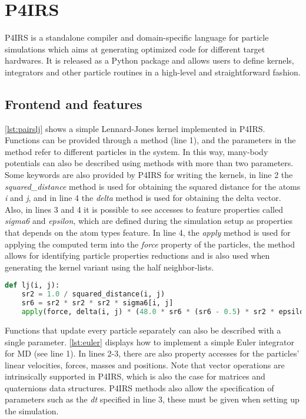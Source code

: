 \documentclass[preprint,12pt]{elsarticle}
\begin{document}

\section{P4IRS}
\label{sec:pairs}

P4IRS is a standalone compiler and domain-specific language for particle simulations which aims at generating optimized code for different target hardwares.
It is released as a Python package and allows users to define kernels, integrators and other particle routines in a high-level and straightforward fashion.

\subsection{Frontend and features}
\label{sec:frontend}

\autoref{lst:pairslj} shows a simple Lennard-Jones kernel implemented in P4IRS.
Functions can be provided through a method (line 1), and the parameters in the method refer to different particles in the system.
In this way, many-body potentials can also be described using methods with more than two parameters.
Some keywords are also provided by P4IRS for writing the kernels, in line 2 the \emph{squared\_distance} method is used for obtaining the squared distance for the atoms \emph{i} and \emph{j}, and in line 4 the \emph{delta} method is used for obtaining the delta vector.
Also, in lines 3 and 4 it is possible to see accesses to feature properties called \emph{sigma6} and \emph{epsilon}, which are defined during the simulation setup as properties that depends on the atom types feature.
In line 4, the \emph{apply} method is used for applying the computed term into the \emph{force} property of the particles, the method allows for identifying particle properties reductions and is also used when generating the kernel variant using the half neighbor-lists.

\begin{lstlisting}[language=Python,
		   label={lst:pairslj},
		   caption={Lennard-Jones force description in P4IRS.}]
def lj(i, j):
    sr2 = 1.0 / squared_distance(i, j)
    sr6 = sr2 * sr2 * sr2 * sigma6[i, j]
    apply(force, delta(i, j) * (48.0 * sr6 * (sr6 - 0.5) * sr2 * epsilon[i, j]))
\end{lstlisting}

Functions that update every particle separately can also be described with a single parameter.
\autoref{lst:euler} displays how to implement a simple Euler integrator for \ac{MD} (see line 1).
In lines 2-3, there are also property accesses for the particles' linear velocities, forces, masses and positions.
Note that vector operations are intrinsically supported in P4IRS, which is also the case for matrices and quaternions data structures.
P4IRS methods also allow the specification of parameters such as the \emph{dt} specified in line 3, these must be given when setting up the simulation.
\end{document}
